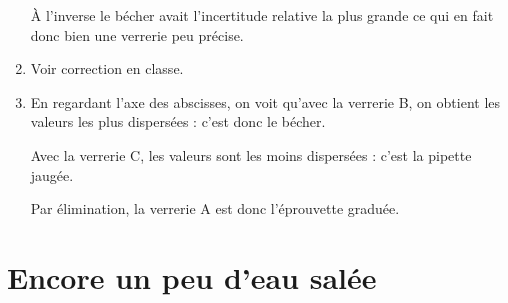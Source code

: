 \begin{enumerate}
À l'inverse le bécher avait l'incertitude relative la plus grande ce qui en fait donc bien une verrerie peu précise.

\item Voir correction en classe.

\item En regardant l'axe des abscisses, on voit qu'avec la verrerie B, on obtient les valeurs les plus dispersées : c'est donc le bécher.

Avec la verrerie C, les valeurs sont les moins dispersées : c'est la pipette jaugée.

Par élimination, la verrerie A est donc l'éprouvette graduée.
\end{enumerate}

\section{Encore un peu d'eau salée}

